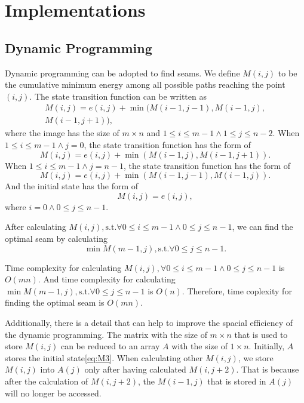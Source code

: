 \documentclass[final]{cvpr}
\begin{document}
\section{Implementations}
\subsection{Dynamic Programming}
Dynamic programming can be adopted to find seams.
We define $M(i,j)$ to be the cumulative minimum energy among all possible paths reaching the point$(i,j)$.
The state transition function can be written as
\begin{equation}
    \begin{aligned}
        M(i,j)=e(i,j)+\min(M(i-1,j-1),M(i-1,j),\\
        M(i-1,j+1)),
    \end{aligned}
    \label{eq:M0}
\end{equation}
where the image has the size of $m\times n$ and $1\le i\le m-1\wedge 1\le j\le n-2$.
When $1\le i\le m-1\wedge j=0$, the state transition function has the form of
\begin{equation}
    M(i,j)=e(i,j)+\min(M(i-1,j),M(i-1,j+1)).
    \label{eq:M1}
\end{equation}
When $1\le i\le m-1\wedge j=n-1$, the state transition function has the form of
\begin{equation}
    M(i,j)=e(i,j)+\min(M(i-1,j-1),M(i-1,j)).
    \label{eq:M2}
\end{equation}
And the initial state has the form of
\begin{equation}
    M(i,j)=e(i,j),
    \label{eq:M3}
\end{equation}
where $i=0\wedge 0\le j\le n-1$.

After calculating $M(i,j),\text{s.t.}\forall 0\le i\le m-1\wedge0\le j\le n-1$, we can find the optimal seam by calculating
\begin{equation}
    \min M(m-1,j),\text{s.t.}\forall0\le j\le n-1.
    \label{eq:minM}
\end{equation}

Time complexity for calculating $M(i,j),\forall 0\le i\le m-1\wedge0\le j\le n-1$ is $O(mn)$.
And time complexity for calculating $\min M(m-1,j),\text{s.t.}\forall0\le j\le n-1$ is $O(n)$.
Therefore, time coplexity for finding the optimal seam is $O(mn)$.

Additionally, there is a detail that can help to improve the spacial efficiency of the dynamic programming.
The matrix with the size of $m\times n$ that is used to store $M(i,j)$ can be reduced to an array $A$ with the size of $1\times n$.
Initially, $A$ stores the initial state\ref{eq:M3}.
When calculating other $M(i,j)$, we store $M(i,j)$ into $A(j)$ only after having calculated $M(i,j+2)$.
That is because after the calculation of $M(i,j+2)$, the $M(i-1,j)$ that is stored in $A(j)$ will no longer be accessed.
\end{document}
